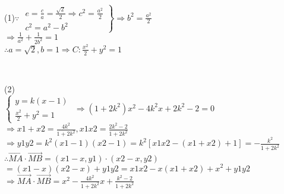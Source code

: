 
\immediate{}
\immediate{}
% 
\begin{minipage}[b][19cm][t]{\textwidth}
\begin{center}\large{}\end{center}
\begin{large}
   \\
\\
\end{large}\\[10pt]
\begin{large}(1)$\because$ $\left.\begin{aligned}
  e=\frac{c}{a}=\frac{\sqrt{2}}{2} \Rightarrow c^2=\frac{a^2}{2}\\
  c^2=a^2-b^2
\end{aligned}\right\} \Longrightarrow b^2=\frac{a^2}{2} $ \\
 $\Rightarrow \frac{1}{a^2}+ \frac{1}{2b^2}=1$ \\
$\therefore a=\sqrt{2},b=1 \Rightarrow C:\frac{x^2}{2}+y^2=1$
\end{large}\\[10pt]
\begin{large}(2)
 \\
$\begin{cases}
  y=k(x-1) \\
  \frac{x^2}{2}+y^2=1
\end{cases}$ $\Rightarrow (1+2k^2)x^2-4k^2x+2k^2-2=0$\\
 $\Rightarrow x1+x2=\frac{4k^2}{1+2k^2},x1x2=\frac{2k^2-2}{1+2k^2}$\\
$\Rightarrow y1y2=k^2(x1-1)(x2-1)=k^2[x1x2-(x1+x2)+1]=-\frac{k^2}{1+2k^2}$\\
$\therefore \vec{MA}\cdot\vec{MB}=(x1-x,y1)\cdot(x2-x,y2)$\\
$=(x1-x)(x2-x)+y1y2=x1x2-x(x1+x2)+x^2+y1y2$\\
$\Rightarrow \vec{MA}\cdot\vec{MB}=x^2-\frac{4k^2}{1+2k^2}x+\frac{k^2-2}{1+2k^2}$\\

\end{large}
\end{minipage}
